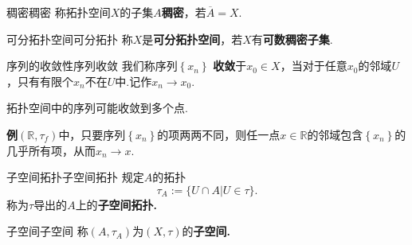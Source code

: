 \documentclass{ctexart}
\begin{document}
\begin{定义}{稠密}{稠密}	
	称拓扑空间$X$的子集$A$\textbf{稠密}，若$\overline{A}=X. $
\end{定义}
\begin{定义}{可分拓扑空间}{可分拓扑}
	称$X$是\textbf{可分拓扑空间}，若$X$有\textbf{可数稠密子集}.
\end{定义}
\begin{定义}{序列的收敛性}{序列收敛}
	我们称序列$\left\lbrace x_n \right\rbrace$ \textbf{收敛}于$x_0\in X$，当对于任意$x_0$的邻域$U$，只有有限个$x_n$不在$U$中.记作$x_n \rightarrow x_0.$
\end{定义}
\begin{注意}
	拓扑空间中的序列可能收敛到多个点.
	
	\textbf{例}\quad  $(\mathbb{R},\tau_f)$中，只要序列$\left\lbrace x_n \right\rbrace$的项两两不同，则任一点$x\in \mathbb{R}$的邻域包含$\left\lbrace x_n \right\rbrace$的几乎所有项，从而$x_n \rightarrow x.$
\end{注意}
\begin{定义}{子空间拓扑}{子空间拓扑}
	规定$A$的拓扑$$
	\tau_A:=\{U\cap A|U\in\tau\}.
	$$称为$\tau$导出的$A$上的\textbf{子空间拓扑.}
\end{定义}
\begin{定义}{子空间}{子空间}
	称$(A,\tau_A)$为$(X,\tau)$的\textbf{子空间.}
\end{定义}
\end{document}
